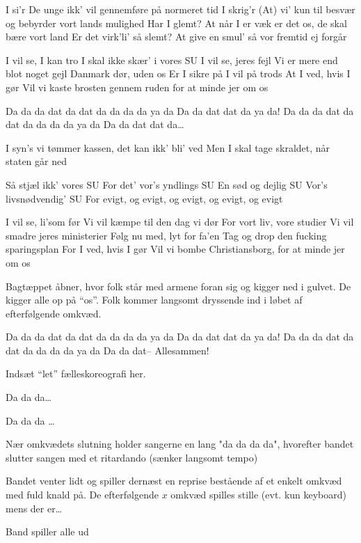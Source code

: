 \documentclass[a4paper,11pt]{article}
\begin{document}
\begin{song}
I si'r
De unge ikk' vil gennemføre på normeret tid
I skrig'r
(At) vi' kun til besvær og bebyrder vort lands mulighed
Har I glemt?
At når I er væk er det os, de skal bære vort land
Er det virk'li' så slemt?
At give en smul' så vor fremtid ej forgår

I vil se, I kan tro
I skal ikke skær' i vores SU
I vil se, jeres fejl
Vi er mere end blot noget gejl
Danmark dør, uden os
Er I sikre på I vil på trods
At I ved, hvis I gør
Vil vi kaste brosten gennem ruden for at minde jer om os

Da da da dat da dat da da da da ya da
Da da dat dat da ya da!
Da da da dat da dat da da da da ya da
Da da dat dat da…

I syn's vi tømmer kassen, det kan ikk' bli' ved
Men I skal tage skraldet, når staten går ned

Så stjæl ikk' vores SU
For det' vor's yndlings SU
En sød og dejlig SU
Vor's livsnødvendig' SU
For evigt, og evigt, og evigt, og evigt, og evigt

I vil se, li'som før
Vi vil kæmpe til den dag vi dør
For vort liv, vore studier
Vi vil smadre jeres ministerier
Følg nu med, lyt for fa'en
Tag og drop den fucking sparingsplan
For I ved, hvis I gør
Vil vi bombe Christiansborg, for at minde jer om os

\scene Bagtæppet åbner, hvor folk står med armene foran sig og kigger ned i gulvet. De kigger alle op på ``os''. Folk kommer langsomt dryssende ind i løbet af efterfølgende omkvæd.

Da da da dat da dat da da da da ya da
Da da dat dat da ya da!
Da da da dat da dat da da da da ya da
Da da dat-- 
Allesammen!

\scene Indsæt ``let'' fælleskoreografi her.

 Da da da\ldots

 Da da da \ldots

\scene Nær omkvædets slutning holder sangerne en lang "da da da da", hvorefter bandet slutter sangen med et ritardando (sænker langsomt tempo)

\scene Bandet venter lidt og spiller dernæst en reprise bestående af et enkelt omkvæd med fuld knald på. De efterfølgende $x$ omkvæd spilles stille (evt. kun keyboard) mens der er\ldots

\scene [Takketaler!]

\scene Band spiller alle ud

\end{song}
\end{document}
